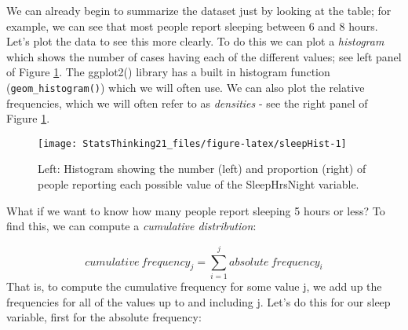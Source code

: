 \documentclass[]{book}
\newenvironment{Shaded}{\begin{snugshade}}{\end{snugshade}}
\newcommand{\KeywordTok}[1]{\textcolor[rgb]{0.13,0.29,0.53}{\textbf{#1}}}
\newcommand{\DataTypeTok}[1]{\textcolor[rgb]{0.13,0.29,0.53}{#1}}
\newcommand{\StringTok}[1]{\textcolor[rgb]{0.31,0.60,0.02}{#1}}
\newcommand{\CommentTok}[1]{\textcolor[rgb]{0.56,0.35,0.01}{\textit{#1}}}
\newcommand{\OperatorTok}[1]{\textcolor[rgb]{0.81,0.36,0.00}{\textbf{#1}}}
\newcommand{\NormalTok}[1]{#1}
\theoremstyle{definition}
\theoremstyle{definition}
\theoremstyle{definition}
\theoremstyle{remark}
\begin{document}
We can already begin to summarize the dataset just by looking at the
table; for example, we can see that most people report sleeping between
6 and 8 hours. Let's plot the data to see this more clearly. To do this
we can plot a \emph{histogram} which shows the number of cases having
each of the different values; see left panel of Figure
\ref{fig:sleepHist}. The ggplot2() library has a built in histogram
function (\texttt{geom\_histogram()}) which we will often use. We can
also plot the relative frequencies, which we will often refer to as
\emph{densities} - see the right panel of Figure \ref{fig:sleepHist}.

\begin{figure}
\texttt{[image: StatsThinking21\_files/figure-latex/sleepHist-1]} \caption{Left: Histogram showing the number (left) and proportion (right) of people reporting each possible value of the SleepHrsNight variable.}\label{fig:sleepHist}
\end{figure}

What if we want to know how many people report sleeping 5 hours or less?
To find this, we can compute a \emph{cumulative distribution}:

\[
cumulative\ frequency_j = \sum_{i=1}^{j}{absolute\ frequency_i}
\] That is, to compute the cumulative frequency for some value j, we add
up the frequencies for all of the values up to and including j. Let's do
this for our sleep variable, first for the absolute frequency:

\begin{Shaded}
\end{Shaded}
\end{document}
